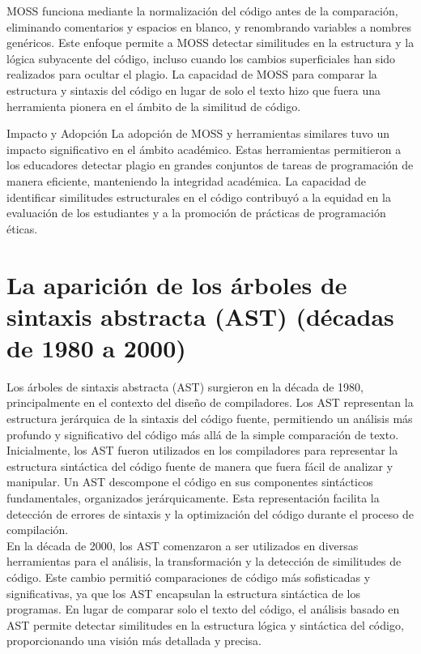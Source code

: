 MOSS funciona mediante la normalización del código antes de la comparación, eliminando comentarios y espacios en blanco, y renombrando variables a nombres genéricos. Este enfoque permite a MOSS detectar similitudes en la estructura y la lógica subyacente del código, incluso cuando los cambios superficiales han sido realizados para ocultar el plagio. La capacidad de MOSS para comparar la estructura y sintaxis del código en lugar de solo el texto hizo que fuera una herramienta pionera en el ámbito de la similitud de código.

Impacto y Adopción
La adopción de MOSS y herramientas similares tuvo un impacto significativo en el ámbito académico. Estas herramientas permitieron a los educadores detectar plagio en grandes conjuntos de tareas de programación de manera eficiente, manteniendo la integridad académica. La capacidad de identificar similitudes estructurales en el código contribuyó a la equidad en la evaluación de los estudiantes y a la promoción de prácticas de programación éticas.

\section*{\textbf{La aparición de los árboles de sintaxis abstracta (AST) (décadas de 1980 a 2000)}}
Los árboles de sintaxis abstracta (AST) surgieron en la década de 1980, principalmente en el contexto del diseño de compiladores. Los AST representan la estructura jerárquica de la sintaxis del código fuente, permitiendo un análisis más profundo y significativo del código más allá de la simple comparación de texto. \\

Inicialmente, los AST fueron utilizados en los compiladores para representar la estructura sintáctica del código fuente de manera que fuera fácil de analizar y manipular. Un AST descompone el código en sus componentes sintácticos fundamentales, organizados jerárquicamente. Esta representación facilita la detección de errores de sintaxis y la optimización del código durante el proceso de compilación. \\

En la década de 2000, los AST comenzaron a ser utilizados en diversas herramientas para el análisis, la transformación y la detección de similitudes de código. Este cambio permitió comparaciones de código más sofisticadas y significativas, ya que los AST encapsulan la estructura sintáctica de los programas. En lugar de comparar solo el texto del código, el análisis basado en AST permite detectar similitudes en la estructura lógica y sintáctica del código, proporcionando una visión más detallada y precisa. \\

